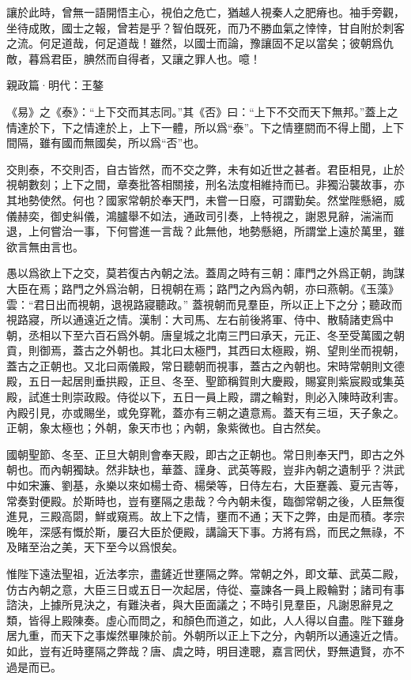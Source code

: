 \documentclass[12pt,a4paper]{ctexbook}
\begin{document}
讓於此時，曾無一語開悟主心，視伯之危亡，猶越人視秦人之肥瘠也。袖手旁觀，坐待成敗，國士之報，曾若是乎？智伯既死，而乃不勝血氣之悻悻，甘自附於刺客之流。何足道哉，何足道哉！雖然，以國士而論，豫讓固不足以當矣；彼朝爲仇敵，暮爲君臣，腆然而自得者，又讓之罪人也。噫！\par
親政篇·明代：王鏊 \par
《易》之《泰》：“上下交而其志同。”其《否》曰：“上下不交而天下無邦。”蓋上之情達於下，下之情達於上，上下一體，所以爲“泰”。下之情壅閼而不得上聞，上下間隔，雖有國而無國矣，所以爲“否”也。\par
交則泰，不交則否，自古皆然，而不交之弊，未有如近世之甚者。君臣相見，止於視朝數刻；上下之間，章奏批答相關接，刑名法度相維持而已。非獨沿襲故事，亦其地勢使然。何也？國家常朝於奉天門，未嘗一日廢，可謂勤矣。然堂陛懸絕，威儀赫奕，御史糾儀，鴻臚舉不如法，通政司引奏，上特視之，謝恩見辭，湍湍而退，上何嘗治一事，下何嘗進一言哉？此無他，地勢懸絕，所謂堂上遠於萬里，雖欲言無由言也。\par
愚以爲欲上下之交，莫若復古內朝之法。蓋周之時有三朝：庫門之外爲正朝，詢謀大臣在焉；路門之外爲治朝，日視朝在焉；路門之內爲內朝，亦曰燕朝。《玉藻》雲：“君日出而視朝，退視路寢聽政。” 蓋視朝而見羣臣，所以正上下之分；聽政而視路寢，所以通遠近之情。漢制：大司馬、左右前後將軍、侍中、散騎諸吏爲中朝，丞相以下至六百石爲外朝。唐皇城之北南三門曰承天，元正、冬至受萬國之朝貢，則御焉，蓋古之外朝也。其北曰太極門，其西曰太極殿，朔、望則坐而視朝，蓋古之正朝也。又北曰兩儀殿，常日聽朝而視事，蓋古之內朝也。宋時常朝則文德殿，五日一起居則垂拱殿，正旦、冬至、聖節稱賀則大慶殿，賜宴則紫宸殿或集英殿，試進士則崇政殿。侍從以下，五日一員上殿，謂之輪對，則必入陳時政利害。內殿引見，亦或賜坐，或免穿靴，蓋亦有三朝之遺意焉。蓋天有三垣，天子象之。正朝，象太極也；外朝，象天市也；內朝，象紫微也。自古然矣。\par
國朝聖節、冬至、正旦大朝則會奉天殿，即古之正朝也。常日則奉天門，即古之外朝也。而內朝獨缺。然非缺也，華蓋、謹身、武英等殿，豈非內朝之遺制乎？洪武中如宋濂、劉基，永樂以來如楊士奇、楊榮等，日侍左右，大臣蹇義、夏元吉等，常奏對便殿。於斯時也，豈有壅隔之患哉？今內朝未復，臨御常朝之後，人臣無復進見，三殿高閟，鮮或窺焉。故上下之情，壅而不通；天下之弊，由是而積。孝宗晚年，深感有慨於斯，屢召大臣於便殿，講論天下事。方將有爲，而民之無祿，不及睹至治之美，天下至今以爲恨矣。\par
惟陛下遠法聖祖，近法孝宗，盡鏟近世壅隔之弊。常朝之外，即文華、武英二殿，仿古內朝之意，大臣三日或五日一次起居，侍從、臺諫各一員上殿輪對；諸司有事諮決，上據所見決之，有難決者，與大臣面議之；不時引見羣臣，凡謝恩辭見之類，皆得上殿陳奏。虛心而問之，和顏色而道之，如此，人人得以自盡。陛下雖身居九重，而天下之事燦然畢陳於前。外朝所以正上下之分，內朝所以通遠近之情。如此，豈有近時壅隔之弊哉？唐、虞之時，明目達聰，嘉言罔伏，野無遺賢，亦不過是而已。\par
\end{document}
